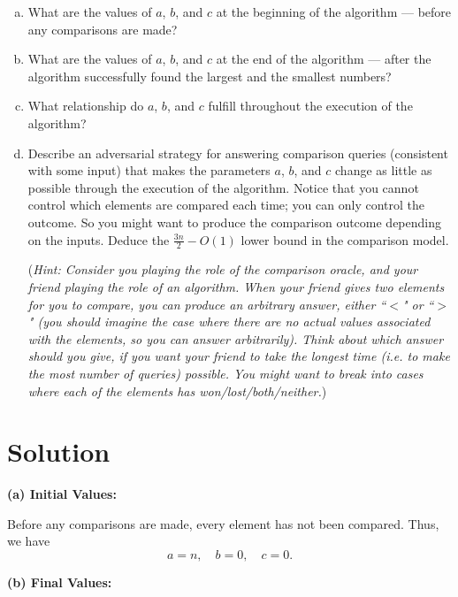 \documentclass[11pt]{article}
\begin{document}
\begin{tcolorbox}[title={Problem 3 (Minimum and Maximum — Lower Bound, 35 pts)}]
    \begin{enumerate}[(a)]
        \item What are the values of $a$, $b$, and $c$ at the beginning of the algorithm — before any comparisons are made?
        \item What are the values of $a$, $b$, and $c$ at the end of the algorithm — after the algorithm successfully found the largest and the smallest numbers?
        \item What relationship do $a$, $b$, and $c$ fulfill throughout the execution of the algorithm?
        \item Describe an adversarial strategy for answering comparison queries (consistent with some input) that makes the parameters $a$, $b$, and $c$ change as little as possible through the execution of the algorithm. Notice that you cannot control which elements are compared each time; you can only control the outcome. So you might want to produce the comparison outcome depending on the inputs. Deduce the $\frac{3n}{2} - O(1)$ lower bound in the comparison model. 
        
        (\textit{Hint: Consider you playing the role of the comparison oracle, and your friend playing the role of an algorithm. When your friend gives two elements for you to compare, you can produce an arbitrary answer, either ``$<$" or ``$>$" (you should imagine the case where there are no actual values associated with the elements, so you can answer arbitrarily). Think about which answer should you give, if you want your friend to take the longest time (i.e. to make the most number of queries) possible. You might want to break into cases where each of the elements has won/lost/both/neither.})
    \end{enumerate}
    \end{tcolorbox}
    \section*{Solution}
    \textbf{(a) Initial Values:} 
    
    Before any comparisons are made, every element has not been compared.  Thus, we have
    \[
    a = n,\quad b = 0,\quad c = 0.
    \]
    
    \bigskip
    
    \textbf{(b) Final Values:}
    
\end{document}
